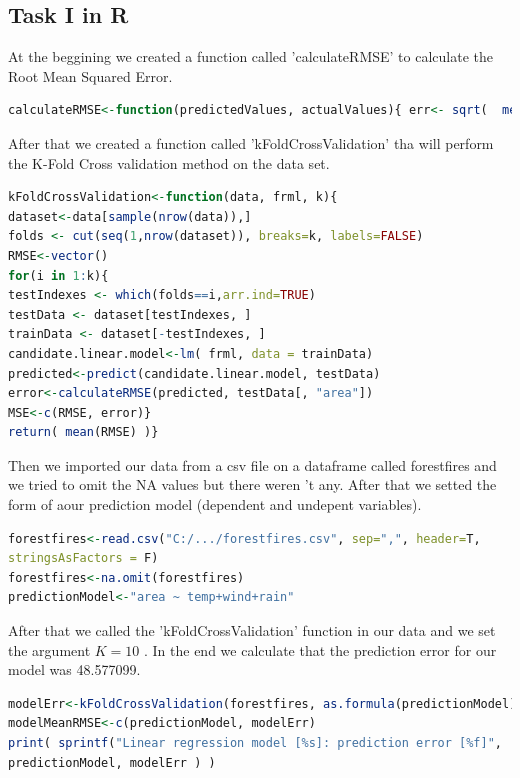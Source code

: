 \documentclass[10pt,a4paper]{article}
\begin{document}
	\subsection{Task I in R}
At the beggining we created a function called 'calculateRMSE' to calculate the Root Mean Squared Error.
	\begin{flushleft}
		\begin{lstlisting}[language= R]
calculateRMSE<-function(predictedValues, actualValues){	err<- sqrt(  mean((actualValues - predictedValues)^2))	return( err )}
		\end{lstlisting}
	\end{flushleft}
After that we created a function called 'kFoldCrossValidation' tha will perform the K-Fold Cross validation method on the data set.
	\begin{flushleft}
		\begin{lstlisting}[language=R]
kFoldCrossValidation<-function(data, frml, k){
dataset<-data[sample(nrow(data)),]
folds <- cut(seq(1,nrow(dataset)), breaks=k, labels=FALSE)
RMSE<-vector()
for(i in 1:k){
testIndexes <- which(folds==i,arr.ind=TRUE)
testData <- dataset[testIndexes, ]
trainData <- dataset[-testIndexes, ]
candidate.linear.model<-lm( frml, data = trainData)
predicted<-predict(candidate.linear.model, testData)
error<-calculateRMSE(predicted, testData[, "area"])
MSE<-c(RMSE, error)}
return( mean(RMSE) )}
		\end{lstlisting}
	\end{flushleft}
Then we imported our data from a csv file on a dataframe called forestfires and we tried to omit the NA values but there weren 't any. After that we setted the form of aour prediction model (dependent  and undepent variables).
	\begin{flushleft}
		\begin{lstlisting}[language=R]
forestfires<-read.csv("C:/.../forestfires.csv", sep=",", header=T,
stringsAsFactors = F)
forestfires<-na.omit(forestfires)
predictionModel<-"area ~ temp+wind+rain"
		\end{lstlisting}
	\end{flushleft}
After that we called the 'kFoldCrossValidation' function in our data and we set the argument \( K = 10  \) . In the end we calculate that the prediction error  for our model was 48.577099.
	\begin{flushleft}
		\begin{lstlisting}[language=R]
modelErr<-kFoldCrossValidation(forestfires, as.formula(predictionModel), 10)
modelMeanRMSE<-c(predictionModel, modelErr)
print( sprintf("Linear regression model [%s]: prediction error [%f]",
predictionModel, modelErr ) )
		\end{lstlisting}
	\end{flushleft}\newpage
\end{document}
